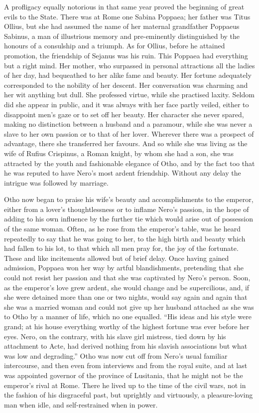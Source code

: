 A profligacy equally notorious in that same year proved the beginning of great evils to the State. There was at Rome one Sabina Poppaea; her father was Titus Ollius, but she had assumed the name of her maternal grandfather Poppaeus Sabinus, a man of illustrious memory and pre-eminently distinguished by the honours of a consulship and a triumph. As for Ollius, before he attained promotion, the friendship of Sejanus was his ruin. This Poppaea had everything but a right mind. Her mother, who surpassed in personal attractions all the ladies of her day, had bequeathed to her alike fame and beauty. Her fortune adequately corresponded to the nobility of her descent. Her conversation was charming and her wit anything but dull. She professed virtue, while she practised laxity. Seldom did she appear in public, and it was always with her face partly veiled, either to disappoint men's gaze or to set off her beauty. Her character she never spared, making no distinction between a husband and a paramour, while she was never a slave to her own passion or to that of her lover. Wherever there was a prospect of advantage, there she transferred her favours. And so while she was living as the wife of Rufius Crispinus, a Roman knight, by whom she had a son, she was attracted by the youth and fashionable elegance of Otho, and by the fact too that he was reputed to have Nero's most ardent friendship. Without any delay the intrigue was followed by marriage.


Otho now began to praise his wife's beauty and accomplishments to the emperor, either from a lover's thoughtlessness or to inflame Nero's passion, in the hope of adding to his own influence by the further tie which would arise out of possession of the same woman. Often, as he rose from the emperor's table, was he heard repeatedly to say that he was going to her, to the high birth and beauty which had fallen to his lot, to that which all men pray for, the joy of the fortunate. These and like incitements allowed but of brief delay. Once having gained admission, Poppaea won her way by artful blandishments, pretending that she could not resist her passion and that she was captivated by Nero's person. Soon, as the emperor's love grew ardent, she would change and be supercilious, and, if she were detained more than one or two nights, would say again and again that she was a married woman and could not give up her husband attached as she was to Otho by a manner of life, which no one equalled. ``His ideas and his style were grand; at his house everything worthy of the highest fortune was ever before her eyes. Nero, on the contrary, with his slave girl mistress, tied down by his attachment to Acte, had derived nothing from his slavish associations but what was low and degrading.'' Otho was now cut off from Nero's usual familiar intercourse, and then even from interviews and from the royal suite, and at last was appointed governor of the province of Lusitania, that he might not be the emperor's rival at Rome. There he lived up to the time of the civil wars, not in the fashion of his disgraceful past, but uprightly and virtuously, a pleasure-loving man when idle, and self-restrained when in power.

